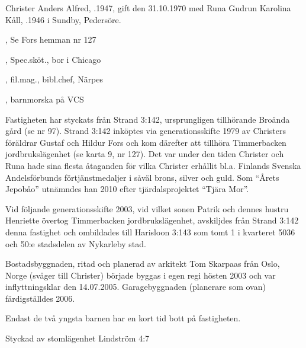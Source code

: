 %



%
Christer Anders Alfred, .1947, gift den 31.10.1970 med Runa Gudrun Karolina Kåll, .1946 i Sundby, Pedersöre.
\begin{jhchildren}
  \item {}, Se Fors hemman nr 127
  \item {}, Spec.sköt., bor i Chicago
  \item {}, fil.mag., bibl.chef, Närpes
  \item {}, barnmorska på VCS
\end{jhchildren}
Fastigheten har styckats från Strand 3:142, ursprungligen tillhörande Broända gård (se nr 97). Strand 3:142 inköptes via generationsskifte 1979 av Christers föräldrar Gustaf och Hildur Fors och kom därefter att tillhöra Timmerbacken jordbrukslägenhet (se karta 9, nr 127). Det var under den tiden Christer och Runa hade sina flesta åtaganden för vilka Christer erhållit bl.a. Finlands Svenska Andelsförbunds förtjänstmedaljer i såväl brons, silver och guld. Som ``Årets Jepobåo'' utnämndes han 2010 efter tjärdalsprojektet ``Tjära Mor''.

Vid följande generationsskifte 2003, vid vilket sonen Patrik och dennes hustru Henriette övertog Timmerbacken jordbrukslägenhet, avskiljdes från Strand 3:142 denna fastighet och ombildades till	Harisloon 3:143 som tomt 1 i kvarteret 5036 och 50:e stadsdelen av	Nykarleby stad.

Bostadsbyggnaden, ritad och planerad av arkitekt Tom Skarpaas	från Oslo, Norge (svåger till Christer) började byggas i egen regi hösten 2003 och var inflyttningsklar den 14.07.2005. Garagebyggnaden (planerare som ovan) färdigställdes 2006.

Endast de två yngsta barnen har en kort tid bott på fastigheten.


%

Styckad av stomlägenhet Lindström 4:7

